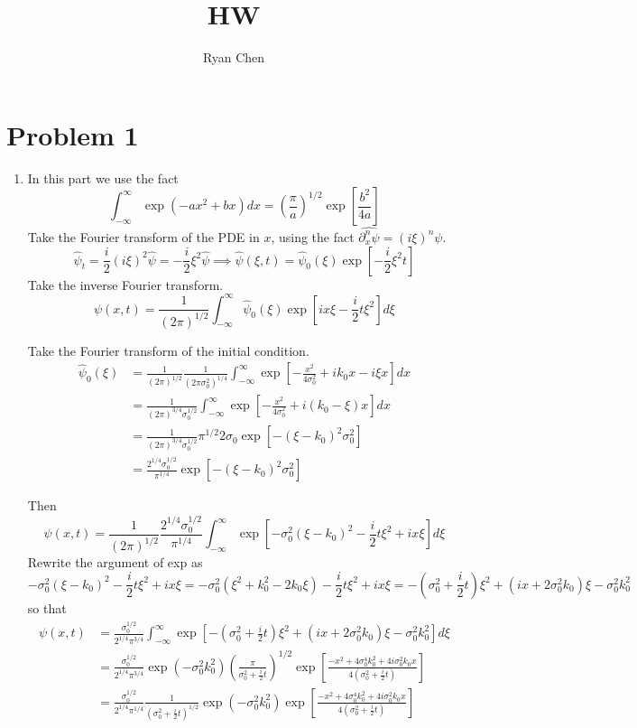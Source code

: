 \documentclass{article}
\title{HW}
\author{Ryan Chen}
\newcommand{\br}[1]{\left(#1\right)}
\newcommand{\imp}{\implies}
\newcommand{\ptl}{\partial}
\begin{document}
	
\maketitle

\section*{Problem 1}

\begin{enumerate}[label=(\alph*)]
	
\item
In this part we use the fact
$$\int_{-\infty}^{\infty}\exp(-ax^2+bx)dx = \br{\frac\pi a}^{1/2}\exp[\frac{b^2}{4a}]$$
Take the Fourier transform of the PDE in $x$, using the fact $\hat{\ptl_x^n\psi}=(i\xi)^n\psi$.
$$\hat\psi_t = \frac i2(i\xi)^2\hat\psi = -\frac i2\xi^2\hat\psi
\imp \hat\psi(\xi,t) = \hat\psi_0(\xi)\exp[-\frac i2\xi^2t]$$
Take the inverse Fourier transform.
$$\psi(x,t) = \frac{1}{(2\pi)^{1/2}}\int_{-\infty}^{\infty} \hat\psi_0(\xi)\exp[ix\xi - \frac i2t\xi^2]d\xi$$

Take the Fourier transform of the initial condition.
\begin{align*}
	\hat\psi_0(\xi) &= \frac{1}{(2\pi)^{1/2}}\frac{1}{(2\pi \sigma_0^2)^{1/4}}\int_{-\infty}^{\infty} \exp[-\frac{x^2}{4\sigma_0^2} + ik_0x - i\xi x]dx\\
	&= \frac{1}{(2\pi)^{3/4}\sigma_0^{1/2}}\int_{-\infty}^{\infty} \exp[-\frac{x^2}{4\sigma_0^2} + i(k_0-\xi)x]dx\\
	&= \frac{1}{(2\pi)^{3/4}\sigma_0^{1/2}}\pi^{1/2}2\sigma_0\exp[-(\xi-k_0)^2\sigma_0^2]\\
	&= \frac{2^{1/4}\sigma_0^{1/2}}{\pi^{1/4}}\exp[-(\xi-k_0)^2\sigma_0^2]
\end{align*}

Then
$$\psi(x,t) = \frac{1}{(2\pi)^{1/2}}\frac{2^{1/4}\sigma_0^{1/2}}{\pi^{1/4}}\int_{-\infty}^{\infty}\exp[-\sigma_0^2(\xi-k_0)^2 - \frac i2t\xi^2 + ix\xi]d\xi$$
Rewrite the argument of exp as
$$-\sigma_0^2(\xi-k_0)^2 - \frac i2t\xi^2 + ix\xi
= -\sigma_0^2(\xi^2+k_0^2-2k_0\xi) - \frac i2t\xi^2 + ix\xi
= -\br{\sigma_0^2 + \frac i2t}\xi^2 + (ix + 2\sigma_0^2k_0)\xi - \sigma_0^2k_0^2$$
so that
\begin{align*}
	\psi(x,t) &= \frac{\sigma_0^{1/2}}{2^{1/4}\pi^{3/4}}\int^{\infty}_{-\infty}\exp[-\br{\sigma_0^2 + \frac i2t}\xi^2 + (ix + 2\sigma_0^2k_0)\xi - \sigma_0^2k_0^2]d\xi\\
	&= \frac{\sigma_0^{1/2}}{2^{1/4}\pi^{3/4}}\exp(-\sigma_0^2k_0^2)\br{\frac{\pi}{\sigma_0^2+\frac i2t}}^{1/2}\exp[\frac{-x^2 + 4\sigma_0^4k_0^2 + 4i\sigma_0^2k_0x}{4\br{\sigma_0^2 + \frac i2t}}]\\
	&= \frac{\sigma_0^{1/2}}{2^{1/4}\pi^{1/4}}\frac{1}{(\sigma_0^2+\frac i2t)^{1/2}}\exp(-\sigma_0^2k_0^2)\exp[\frac{-x^2 + 4\sigma_0^4k_0^2 + 4i\sigma_0^2k_0x}{4\br{\sigma_0^2 + \frac i2t}}]
\end{align*}


\end{enumerate}
\end{document}
